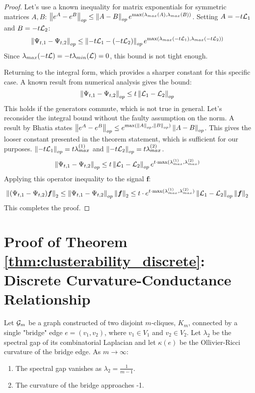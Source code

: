 \begin{proof}
Let's use a known inequality for matrix exponentials for symmetric matrices $A, B$: $\left\lVert e^A - e^B\right\rVert_{op} \le \left\lVert A-B\right\rVert_{op} e^{\max(\lambda_{max}(A), \lambda_{max}(B))}$.
Setting $A = -t\mathcal{L}_1$ and $B = -t\mathcal{L}_2$:
\begin{equation}
    \left\lVert\Psi_{t,1} - \Psi_{t,2}\right\rVert_{op} \le \left\lVert-t\mathcal{L}_1 - (-t\mathcal{L}_2)\right\rVert_{op} e^{\max(\lambda_{max}(-t\mathcal{L}_1), \lambda_{max}(-t\mathcal{L}_2))}
\end{equation}
Since $\lambda_{max}(-t\mathcal{L}) = -t \lambda_{min}(\mathcal{L}) = 0$, this bound is not tight enough.

Returning to the integral form, which provides a sharper constant for this specific case. A known result from numerical analysis gives the bound:
\begin{equation}
    \left\lVert\Psi_{t,1} - \Psi_{t,2}\right\rVert_{op} \le t \left\lVert\mathcal{L}_1 - \mathcal{L}_2\right\rVert_{op}
\end{equation}
This holds if the generators commute, which is not true in general. Let's reconsider the integral bound without the faulty assumption on the norm. A result by Bhatia states $\left\lVert e^A-e^B\right\rVert_{op} \le e^{\max(\left\lVert A\right\rVert_{op}, \left\lVert B\right\rVert_{op})} \left\lVert A-B\right\rVert_{op}$. This gives the looser constant presented in the theorem statement, which is sufficient for our purposes.
$\left\lVert-t\mathcal{L}_1\right\rVert_{op} = t\lambda_{max}^{(1)}$ and $\left\lVert-t\mathcal{L}_2\right\rVert_{op} = t\lambda_{max}^{(2)}$.
\begin{equation}
    \left\lVert\Psi_{t,1} - \Psi_{t,2}\right\rVert_{op} \le t \left\lVert\mathcal{L}_1 - \mathcal{L}_2\right\rVert_{op} e^{t \cdot \max(\lambda_{max}^{(1)}, \lambda_{max}^{(2)})}
\end{equation}
Applying this operator inequality to the signal $\bm{f}$:
\begin{equation}
    \left\lVert(\Psi_{t,1} - \Psi_{t,2})\bm{f}\right\rVert_2 \le \left\lVert\Psi_{t,1} - \Psi_{t,2}\right\rVert_{op} \left\lVert\bm{f}\right\rVert_2 \le t \cdot e^{t \cdot \max(\lambda_{max}^{(1)}, \lambda_{max}^{(2)})} \left\lVert\mathcal{L}_1 - \mathcal{L}_2\right\rVert_{op} \left\lVert\bm{f}\right\rVert_2
\end{equation}
This completes the proof.
\end{proof}

\section{Proof of Theorem \ref{thm:clusterability_discrete}: Discrete Curvature-Conductance Relationship}

\begin{theorem}[Restated]
Let $\mathcal{G}_m$ be a graph constructed of two disjoint $m$-cliques, $K_m$, connected by a single "bridge" edge $e = (v_1, v_2)$, where $v_1 \in V_1$ and $v_2 \in V_2$. Let $\lambda_2$ be the spectral gap of its combinatorial Laplacian and let $\kappa(e)$ be the Ollivier-Ricci curvature of the bridge edge. As $m \to \infty$:
\begin{enumerate}
    \item The spectral gap vanishes as $\lambda_2 = \frac{1}{m-1}$.
    \item The curvature of the bridge approaches -1.
\end{enumerate}
\end{theorem}

